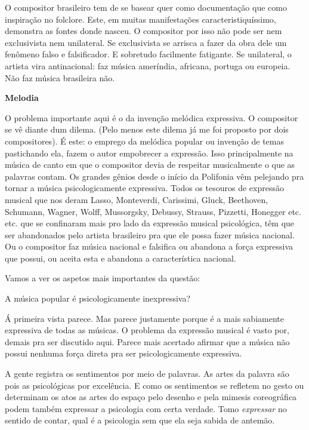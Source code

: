 O compositor brasileiro tem de se basear quer como documentação que como
inspiração no folclore. Este, em muitas manifestações
caracteristiquíssimo, demonstra as fontes donde nasceu. O compositor por
isso não pode ser nem exclusivista nem unilateral. Se exclusivista se
arrisca a fazer da obra dele um fenômeno falso e falsificador. E
sobretudo facilmente fatigante. Se unilateral, o artista vira
antinacional: faz música ameríndia, africana, portuga ou europeia. Não
faz música brasileira não.~

\textbf{Melodia}

O problema importante aqui é o da invenção melódica expressiva. O
compositor se vê diante dum dilema. (Pelo menos este dilema já me foi
proposto por dois compositores). É este: o emprego da melódica popular
ou invenção de temas pastichando ela, fazem o autor empobrecer a
expressão. Isso principalmente na música de canto em que o compositor
devia de respeitar musicalmente o que as palavras contam. Os grandes
gênios desde o início da Polifonia vêm pelejando pra tornar a música
psicologicamente expressiva. Todos os tesouros de expressão musical que
nos deram Lasso, Monteverdi, Carissimi, Gluck, Beethoven, Schumann,
Wagner, Wolff, Mussorgsky, Debussy, Strauss, Pizzetti, Honegger etc.
etc. que se confinaram mais pro lado da expressão musical psicológica,
têm que ser abandonados pelo artista brasileiro pra que ele possa fazer
música nacional. Ou o compositor faz música nacional e falsifica ou
abandona a força expressiva que possui, ou aceita esta e abandona a
característica nacional.~

Vamos a ver os aspetos mais importantes da questão:~

A música popular é psicologicamente inexpressiva?~

Á primeira vista parece. Mas parece justamente porque é a mais
sabiamente expressiva de todas as músicas. O problema da expressão
musical é vasto por, demais pra ser discutido aqui. Parece mais acertado
afirmar que a música não possui nenhuma força direta pra ser
psicologicamente expressiva.~

A gente registra os sentimentos por meio de palavras. As artes da
palavra são pois as psicológicas por excelência. E como os sentimentos
se refletem no gesto ou determinam os atos as artes do espaço pelo
desenho e pela mimesis coreográfica podem também expressar a psicologia
com certa verdade. Tomo \emph{expressar} no sentido de contar, qual é a
psicologia sem que ela seja sabida de antemão.~

